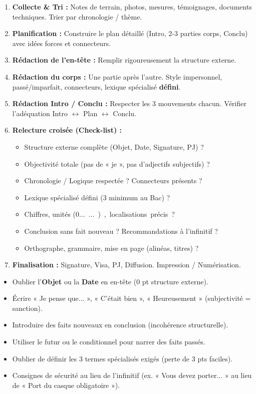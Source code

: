 \documentclass[11pt]{article}
\begin{document}
\begin{methode}
\begin{enumerate}
\item \textbf{Collecte \& Tri :} Notes de terrain, photos, mesures, témoignages, documents techniques. Trier par chronologie / thème.
\item \textbf{Planification :} Construire le plan détaillé (Intro, 2-3 parties corps, Conclu) avec idées forces et connecteurs.
\item \textbf{Rédaction de l'en-tête :} Remplir rigoureusement la structure externe.
\item \textbf{Rédaction du corps :} Une partie après l'autre. Style impersonnel, passé/imparfait, connecteurs, lexique spécialisé \textbf{défini}.
\item \textbf{Rédaction Intro / Conclu :} Respecter les 3 mouvements chacun. Vérifier l'adéquation Intro $\leftrightarrow$ Plan $\leftrightarrow$ Conclu.
\item \textbf{Relecture croisée (Check-list) :}
\begin{itemize}
\item [$\square$] Structure externe complète (Objet, Date, Signature, PJ) ?
\item [$\square$] Objectivité totale (pas de « je », pas d'adjectifs subjectifs) ?
\item [$\square$] Chronologie / Logique respectée ? Connecteurs présents ?
\item [$\square$] Lexique spécialisé défini (3 minimum au Bac) ?
\item [$\square$] Chiffres, unités (\SI{...}{...}), localisations précis ?
\item [$\square$] Conclusion sans fait nouveau ? Recommandations à l'infinitif ?
\item [$\square$] Orthographe, grammaire, mise en page (alinéas, titres) ?
\end{itemize}
\item \textbf{Finalisation :} Signature, Visa, PJ, Diffusion. Impression / Numérisation.
\end{enumerate}
\end{methode}

\begin{attention}
\begin{itemize}
\item Oublier l'\textbf{Objet} ou la \textbf{Date} en en-tête (0 pt structure externe).
\item Écrire « Je pense que... », « C'était bien », « Heureusement » (subjectivité = sanction).
\item Introduire des faits nouveaux en conclusion (incohérence structurelle).
\item Utiliser le futur ou le conditionnel pour narrer des faits passés.
\item Oublier de définir les 3 termes spécialisés exigés (perte de 3 pts faciles).
\item Consignes de sécurité au lieu de l'infinitif (ex. « Vous devez porter... » au lieu de « Port du casque obligatoire »).
\end{itemize}
\end{attention}
\end{document}
